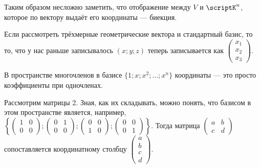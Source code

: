 \documentclass{article}
\begin{document}
\begin{itemize}
\begin{Proof}
        \end{Proof}
        \begin{Comment}
            Таким образом несложно заметить, что отображение между $V$ и $\scriptK^n$, которое по вектору выдаёт его координаты --- биекция.
        \end{Comment}
        \begin{Example}
            Если рассмотреть трёхмерные геометрические вектора и стандартный базис, то то, что у нас раньше записывалось $(x;y;z)$ теперь записывается как $\left(\begin{matrix}
                x_1\\
                x_2\\
                x_3
            \end{matrix}\right)$.
        \end{Example}
        \begin{Example}
            В пространстве многочленов в базисе $\{1;x;x^2;\ldots;x^n\}$ координаты --- это просто коэффициенты при одночленах.
        \end{Example}
        \begin{Example}
            Рассмотрим матрицы 2. Зная, как их складывать, можно понять, что базисом в этом пространстве является, например, $\left\{\left(\begin{matrix}1&0\\0&0\end{matrix}\right);\left(\begin{matrix}0&1\\0&0\end{matrix}\right);\left(\begin{matrix}0&0\\1&0\end{matrix}\right);\left(\begin{matrix}0&0\\0&1\end{matrix}\right)\right\}$. Тогда матрица $\left(\begin{matrix}a&b\\c&d\end{matrix}\right)$ сопоставляется координатному столбцу $\left(\begin{matrix}a\\b\\c\\d\end{matrix}\right)$.
        \end{Example}
        \begin{Comment}

\end{Comment}
\end{itemize}
\end{document}
